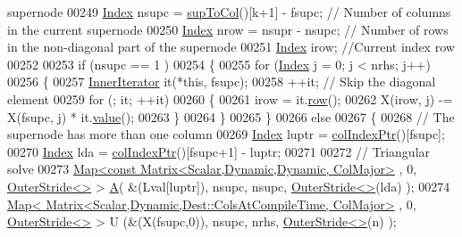 \begin{DoxyCode}
{       supernode}
00249       \hyperlink{namespace_eigen_a62e77e0933482dafde8fe197d9a2cfde}{Index} nsupc = \hyperlink{group___sparse_l_u___module_ab2b1bdd663288f1f2af09ec42a0a62a5}{supToCol}()[k+1] - fsupc;          \textcolor{comment}{// Number of columns in the current
       supernode}
00250       \hyperlink{namespace_eigen_a62e77e0933482dafde8fe197d9a2cfde}{Index} nrow = nsupr - nsupc;                     \textcolor{comment}{// Number of rows in the non-diagonal part of
       the supernode}
00251       \hyperlink{namespace_eigen_a62e77e0933482dafde8fe197d9a2cfde}{Index} irow;                                     \textcolor{comment}{//Current index row}
00252       
00253       \textcolor{keywordflow}{if} (nsupc == 1 )
00254       \{
00255         \textcolor{keywordflow}{for} (\hyperlink{namespace_eigen_a62e77e0933482dafde8fe197d9a2cfde}{Index} j = 0; j < nrhs; j++)
00256         \{
00257           \hyperlink{class_eigen_1_1_inner_iterator}{InnerIterator} it(*\textcolor{keyword}{this}, fsupc);
00258           ++it; \textcolor{comment}{// Skip the diagonal element}
00259           \textcolor{keywordflow}{for} (; it; ++it)
00260           \{
00261             irow = it.\hyperlink{class_eigen_1_1_inner_iterator_a3ab6f3afdf62740623cdc9ecb14dc132}{row}();
00262             X(irow, j) -= X(fsupc, j) * it.\hyperlink{class_eigen_1_1_inner_iterator_ab04bccb41eb22ffcb92dc61125aab119}{value}();
00263           \}
00264         \}
00265       \}
00266       \textcolor{keywordflow}{else}
00267       \{
00268         \textcolor{comment}{// The supernode has more than one column }
00269         \hyperlink{namespace_eigen_a62e77e0933482dafde8fe197d9a2cfde}{Index} luptr = \hyperlink{group___sparse_l_u___module_a87c0272aedd8ee01d4245bd719738b5d}{colIndexPtr}()[fsupc]; 
00270         \hyperlink{namespace_eigen_a62e77e0933482dafde8fe197d9a2cfde}{Index} lda = \hyperlink{group___sparse_l_u___module_a87c0272aedd8ee01d4245bd719738b5d}{colIndexPtr}()[fsupc+1] - luptr;
00271         
00272         \textcolor{comment}{// Triangular solve }
00273         \hyperlink{group___core___module_class_eigen_1_1_map}{Map<const Matrix<Scalar,Dynamic,Dynamic, ColMajor>}
      , 0, \hyperlink{class_eigen_1_1_outer_stride}{OuterStride<>} > \hyperlink{group___core___module_class_eigen_1_1_matrix}{A}( &(Lval[luptr]), nsupc, nsupc, \hyperlink{class_eigen_1_1_outer_stride}{OuterStride<>}(lda) );
00274         \hyperlink{group___core___module_class_eigen_1_1_map}{Map< Matrix<Scalar,Dynamic,Dest::ColsAtCompileTime, ColMajor>}
      , 0, \hyperlink{class_eigen_1_1_outer_stride}{OuterStride<>} > U (&(X(fsupc,0)), nsupc, nrhs, \hyperlink{class_eigen_1_1_outer_stride}{OuterStride<>}(n) );

\end{DoxyCode}
